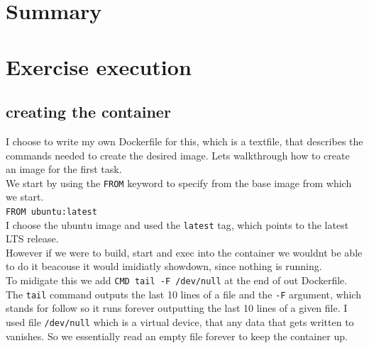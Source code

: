 \documentclass[a4paper]{article}
\begin{document}
\section{Summary}


\newpage

\section{Exercise execution}

\subsection {creating the container}

I choose to write my own Dockerfile for this, which is a textfile, that describes the commands needed to create the desired image. Lets walkthrough how to create an image for the first task. \\
We start by using the \texttt{FROM} keyword to specify from the base image \cite{docker-glossary} from which we start.
\\
\texttt{FROM ubuntu:latest} \\
I choose the ubuntu image \cite{ubuntu} and used the \texttt{latest} tag, which points to the latest LTS release.\\
However if we were to build, start and exec into the container we wouldnt be able to do it beacouse it would imidiatly showdown, since nothing is running. \\

To midigate this we add \texttt{CMD tail -F /dev/null} at the end of out Dockerfile. The \texttt{tail} command outputs the last 10 lines of a file and the \texttt{-F} argument, which stands for follow so it runs forever outputting the last 10 lines of a given file.\cite{tail} I used file \texttt{/dev/null} which is a virtual device, that any data that gets written to vanishes. \cite{devnull} So we essentially read an empty file forever to keep the container up. \\
\end{document}
